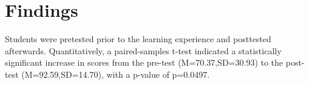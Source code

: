 \documentclass[letterpaper]{article}
\begin{document}
\section{Findings}
Students were pretested prior to the learning experience and posttested afterwards. Quantitatively, a paired-samples t-test indicated a statistically significant increase in scores from the pre-test (M=70.37,SD=30.93) to the post-test (M=92.59,SD=14.70), with a p-value of p=0.0497.

%
%

\printbibliography
\end{document}

